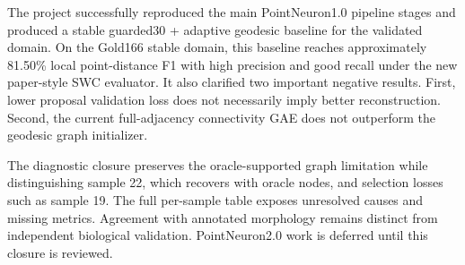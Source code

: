 \documentclass[11pt]{article}
\begin{document}
The project successfully reproduced the main PointNeuron1.0 pipeline stages and
produced a stable guarded30 + adaptive geodesic baseline for the validated
domain. On the Gold166 stable domain, this baseline reaches approximately
81.50\% local point-distance F1 with high precision and good recall under the
new paper-style SWC evaluator. It also clarified two important negative
results. First, lower proposal validation loss does not necessarily imply better
reconstruction. Second, the current full-adjacency connectivity GAE does not
outperform the geodesic graph initializer.

The diagnostic closure preserves the oracle-supported graph limitation while
distinguishing sample 22, which recovers with oracle nodes, and selection losses
such as sample 19. The full per-sample table exposes unresolved causes and missing
metrics. Agreement with annotated morphology remains distinct from independent
biological validation. PointNeuron2.0 work is deferred until this closure is reviewed.
\end{document}
